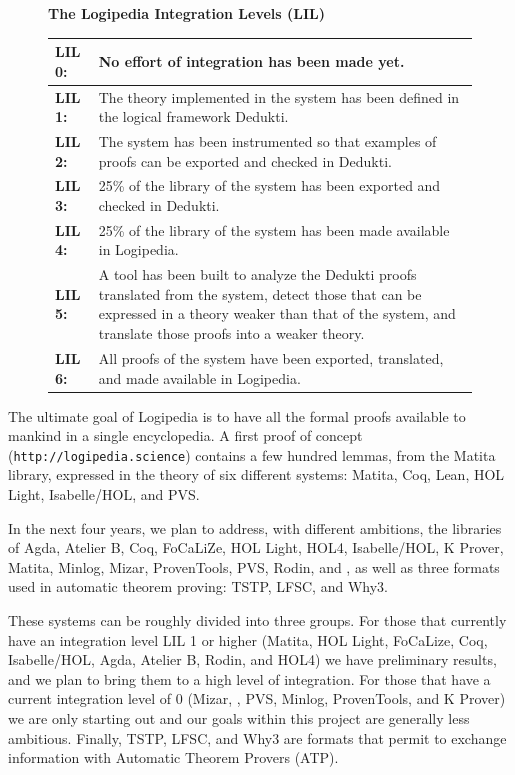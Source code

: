 \begin{figure}[ht]
\begin{shaded}
\begin{center}
{\bf \Large The Logipedia Integration Levels (LIL)\label{lil}}
\end{center}

\begin{longtable}{|p{}|p{}|}
\hline
{\bf LIL 0:} & No effort of integration has been made yet.\\
\hline
{\bf LIL 1:} & The theory implemented in the system has been defined in
the logical framework Dedukti.\\
\hline
{\bf LIL 2:} & The system has been instrumented so that examples of proofs
can be exported and checked in Dedukti.\\
\hline
{\bf LIL 3:} & 25\% of the library of the system has been
exported and checked in Dedukti.\\
\hline
{\bf LIL 4:} & 25\% of the library of the system has
been made available in Logipedia.\\
\hline
{\bf LIL 5:} & A tool has been built to analyze the Dedukti proofs
translated from the system, detect those that can be expressed in a theory
weaker than that of the system, and translate those proofs into a
weaker theory.\\
\hline
{\bf LIL 6:} & All proofs of the system have been exported, translated,
and made available in Logipedia.\\
\hline
\end{longtable}
\end{shaded}
\end{figure}

The ultimate goal of Logipedia is to have all the formal proofs
available to mankind in a single encyclopedia.  A first proof of
concept ({\tt http://logipedia.science}) contains a few hundred
lemmas, from the Matita library, expressed in the theory of six
different systems: Matita, Coq, Lean, HOL Light, Isabelle/HOL, and
PVS.

In the next four years, we plan to address, with different ambitions,
the libraries of Agda, Atelier B, Coq, FoCaLiZe, HOL Light, HOL4,
Isabelle/HOL, K Prover, Matita, Minlog, Mizar, ProvenTools, PVS,
Rodin, and \tlaplus, as well as three formats used in automatic
theorem proving: TSTP, LFSC, and Why3. 

These systems can be roughly divided into three groups.  For those
that currently have an integration level LIL 1 or higher (Matita, HOL
Light, FoCaLize, Coq, Isabelle/HOL, Agda, Atelier B, Rodin, and HOL4)
we have preliminary results, and we plan to bring them to a high level
of integration.  For those that have a current integration level of 0
(Mizar, \tlaplus, PVS, Minlog, ProvenTools, and K Prover) we are only
starting out and our goals within this project are generally less
ambitious. Finally, TSTP, LFSC, and Why3 are formats that permit
to exchange information with Automatic Theorem Provers (ATP).

